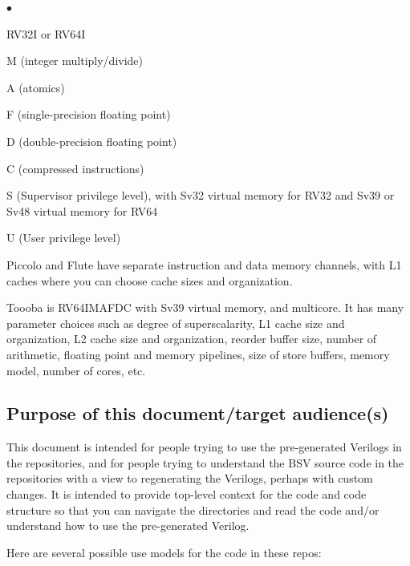 \documentclass[11pt]{book}
\newenvironment{tightlist}%
{\begin{list}{$\bullet$}{%
    \setlength{\topsep}{0in}
    \setlength{\partopsep}{0in}
    \setlength{\itemsep}{0in}
    \setlength{\parsep}{0in}
    \setlength{\leftmargin}{1.5em}
    \setlength{\rightmargin}{0in}
    \setlength{\itemindent}{0in}
}
}%
{\end{list}
}
\begin{document}
\begin{tightlist}

\item RV32I or RV64I
\item M (integer multiply/divide)
\item A (atomics)
\item F (single-precision floating point)
\item D (double-precision floating point)
\item C (compressed instructions)
\item S (Supervisor privilege level), with Sv32 virtual memory for
RV32 and Sv39 or Sv48 virtual memory for RV64

\item U (User privilege level)

\end{tightlist}

Piccolo and Flute have separate instruction and data memory channels,
with L1 caches where you can choose cache sizes and organization.

Toooba is RV64IMAFDC with Sv39 virtual memory, and multicore.  It has
many parameter choices such as degree of superscalarity, L1 cache size
and organization, L2 cache size and organization, reorder buffer size,
number of arithmetic, floating point and memory pipelines, size of
store buffers, memory model, number of cores, etc.


\subsection{Purpose of this document/target audience(s)}

This document is intended for people trying to use the pre-generated
Verilogs in the repositories, and for people trying to understand the
BSV source code in the repositories with a view to regenerating the
Verilogs, perhaps with custom changes.  It is intended to provide
top-level context for the code and code structure so that you can
navigate the directories and read the code and/or understand how to
use the pre-generated Verilog.

Here are several possible use models for the code in these repos:
\end{document}
